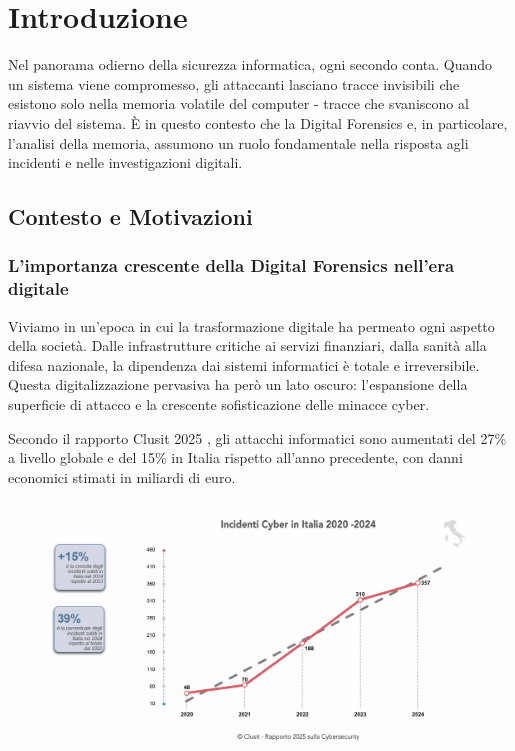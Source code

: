 \chapter{Introduzione}

Nel panorama odierno della sicurezza informatica, ogni secondo conta. Quando un sistema viene compromesso, gli attaccanti lasciano tracce invisibili che esistono solo nella memoria volatile del computer - tracce che svaniscono al riavvio del sistema. È in questo contesto che la Digital Forensics e, in particolare, l'analisi della memoria, assumono un ruolo fondamentale nella risposta agli incidenti e nelle investigazioni digitali.

\section{Contesto e Motivazioni}

\subsection{L'importanza crescente della Digital Forensics nell'era digitale}

Viviamo in un'epoca in cui la trasformazione digitale ha permeato ogni aspetto della società. Dalle infrastrutture critiche ai servizi finanziari, dalla sanità alla difesa nazionale, la dipendenza dai sistemi informatici è totale e irreversibile. Questa digitalizzazione pervasiva ha però un lato oscuro: l'espansione della superficie di attacco e la crescente sofisticazione delle minacce cyber.

Secondo il rapporto Clusit 2025 \cite{clusit2025}, gli attacchi informatici sono aumentati del 27\% a livello globale e del 15\% in Italia rispetto all'anno precedente, con danni economici stimati in miliardi di euro.

\begin{figure}[H]
    \centering
    \includegraphics[width=1\linewidth]{images/intro/clusit-ita.png}
\end{figure}

